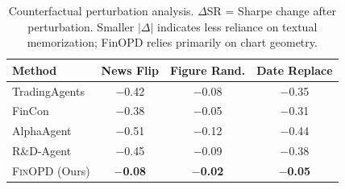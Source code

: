 \begin{table}[t]
\renewcommand{\arraystretch}{0.95}
\footnotesize
\caption{Counterfactual perturbation analysis. $\Delta$SR = Sharpe change after perturbation. Smaller $|\Delta|$ indicates less reliance on textual memorization; FinOPD relies primarily on chart geometry.}
\setlength{\abovecaptionskip}{0.1cm}
\centering
\setlength{\tabcolsep}{3pt}
\begin{tabular}{lccc}
\toprule
Method & News Flip & Figure Rand. & Date Replace \\
\midrule
TradingAgents & $-$0.42 & $-$0.08 & $-$0.35 \\
FinCon & $-$0.38 & $-$0.05 & $-$0.31 \\
AlphaAgent & $-$0.51 & $-$0.12 & $-$0.44 \\
R\&D-Agent & $-$0.45 & $-$0.09 & $-$0.38 \\
\textsc{FinOPD} (Ours) & \textbf{$-$0.08} & \textbf{$-$0.02} & \textbf{$-$0.05} \\
\bottomrule
\end{tabular}
\label{tab:counterfactual}
\end{table}
